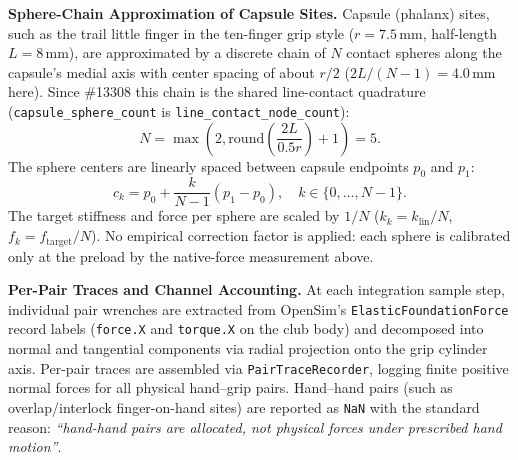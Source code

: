 \documentclass[11pt,a4paper]{article}
\begin{document}
\textbf{Sphere-Chain Approximation of Capsule Sites.} Capsule (phalanx) sites, such as the trail little finger
in the ten-finger grip style ($r = 7.5$\,mm, half-length $L = 8$\,mm), are approximated by a discrete chain
of $N$ contact spheres along the capsule's medial axis with center spacing of about $r/2$ ($2L/(N-1) = 4.0$\,mm here). Since
\#13308 this chain is the shared line-contact quadrature (\texttt{capsule\_sphere\_count} is \texttt{line\_contact\_node\_count}):
\begin{equation}
N = \max\left(2, \mathrm{round}\left(\frac{2L}{0.5r}\right) + 1\right) = 5.
\end{equation}
The sphere centers are linearly spaced between capsule endpoints $p_0$ and $p_1$:
\begin{equation}
c_k = p_0 + \frac{k}{N - 1}(p_1 - p_0), \quad k \in \{0, \dots, N - 1\}.
\end{equation}
The target stiffness and force per sphere are scaled by $1/N$ ($k_k = k_{\mathrm{lin}}/N$, $f_k = f_{\mathrm{target}}/N$).
No empirical correction factor is applied: each sphere is calibrated only at the preload by the native-force
measurement above.

\textbf{Per-Pair Traces and Channel Accounting.} At each integration sample step, individual pair wrenches
are extracted from OpenSim's \texttt{ElasticFoundationForce} record labels (\texttt{force.X} and \texttt{torque.X}
on the club body) and decomposed into normal and tangential components via radial projection onto the grip cylinder axis.
Per-pair traces are assembled via \texttt{PairTraceRecorder}, logging finite positive normal forces for all physical
hand--grip pairs. Hand--hand pairs (such as overlap/interlock finger-on-hand sites) are reported as \texttt{NaN}
with the standard reason: \textit{``hand-hand pairs are allocated, not physical forces under prescribed hand motion''}.
\end{document}

